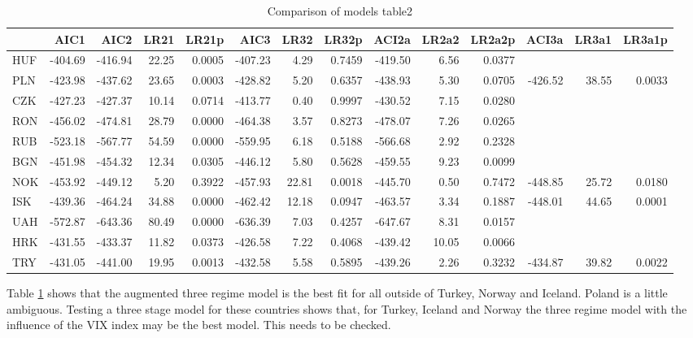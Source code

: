 \documentclass[12pt, a4paper, oneside]{article} %
\begin{document}
\begin{landscape}
\begin{table}[ht]
\centering
\begin{tabular}{l|rrrrrrrrrrrrr}
  \hline
 & AIC1 & AIC2 & LR21 & LR21p & AIC3 & LR32 & LR32p &ACI2a& LR2a2 & LR2a2p& ACI3a & LR3a1& LR3a1p\\ 
  \hline
  HUF & -404.69 & -416.94 & 22.25 & 0.0005 & -407.23 & 4.29 & 0.7459 & -419.50 &6.56 & 0.0377&&&\\ 
  PLN & -423.98 & -437.62 & 23.65 & 0.0003 & -428.82 & 5.20 & 0.6357 & -438.93 &5.30 & 0.0705&-426.52&38.55&0.0033\\ 
  CZK & -427.23 & -427.37 & 10.14 & 0.0714 & -413.77 & 0.40 & 0.9997 & -430.52 &7.15 & 0.0280&&&\\ 
  RON & -456.02 & -474.81 & 28.79 & 0.0000 & -464.38 & 3.57 & 0.8273 & -478.07 &7.26 & 0.0265&&&\\ 
  RUB & -523.18 & -567.77 & 54.59 & 0.0000 & -559.95 & 6.18 & 0.5188 & -566.68 &2.92 & 0.2328&&&\\ 
  BGN & -451.98 & -454.32 & 12.34 & 0.0305 & -446.12 & 5.80 & 0.5628 & -459.55 &9.23 & 0.0099&&&\\ 
  NOK & -453.92 & -449.12 &  5.20 & 0.3922 & -457.93 & 22.81 & 0.0018& -445.70 &0.50 & 0.7472&-448.85&25.72&0.0180\\ 
  ISK & -439.36 & -464.24 & 34.88 & 0.0000 & -462.42 & 12.18 & 0.0947& -463.57 &3.34 & 0.1887&-448.01&44.65&0.0001\\ 
  UAH & -572.87 & -643.36 & 80.49 & 0.0000 & -636.39 & 7.03 & 0.4257 & -647.67 &8.31 & 0.0157&&&\\ 
  HRK & -431.55 & -433.37 & 11.82 & 0.0373 & -426.58 & 7.22 & 0.4068 & -439.42 &10.05& 0.0066&&&\\ 
  TRY & -431.05 & -441.00 & 19.95 & 0.0013 & -432.58 & 5.58 & 0.5895 & -439.26 &2.26 & 0.3232& -434.87 & 39.82 & 0.0022\\ 
   \hline
\end{tabular}
\caption{Comparison of models table2} 
\label{tabref:comptab2}
\end{table} 
\end{landscape}



Table \ref{tabref:comptab2} shows that the augmented three regime model is the best fit for all outside of Turkey, Norway and Iceland.  Poland is a little ambiguous.  Testing a three stage model for these countries shows that, for Turkey, Iceland and Norway the three regime model with the influence of the VIX index may be the best model. This needs to be checked.  
\end{document}
